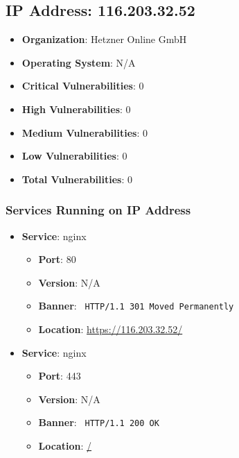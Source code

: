\documentclass{article}
\begin{document}
\clearpage



\subsection*{IP Address: 116.203.32.52}

\begin{itemize}
    \item \textbf{Organization}: Hetzner Online GmbH
    \item \textbf{Operating System}:  N/A 
    \item \textbf{Critical Vulnerabilities}: 0
    \item \textbf{High Vulnerabilities}: 0
    \item \textbf{Medium Vulnerabilities}: 0
    \item \textbf{Low Vulnerabilities}: 0
    \item \textbf{Total Vulnerabilities}: 0
\end{itemize}

\subsubsection*{Services Running on IP Address}

\begin{itemize}
    
        \item \textbf{Service}: nginx
        \begin{itemize}
            \item \textbf{Port}: 80
            \item \textbf{Version}:  N/A 
            \item \textbf{Banner}: \texttt{
                HTTP/1.1 301 Moved Permanently
            }
            \item \textbf{Location}: \href{ https://116.203.32.52/ }{ https://116.203.32.52/ }
        \end{itemize}
    
        \item \textbf{Service}: nginx
        \begin{itemize}
            \item \textbf{Port}: 443
            \item \textbf{Version}:  N/A 
            \item \textbf{Banner}: \texttt{
                HTTP/1.1 200 OK
            }
            \item \textbf{Location}: \href{ / }{ / }
        \end{itemize}
    
\end{itemize}
\end{document}
